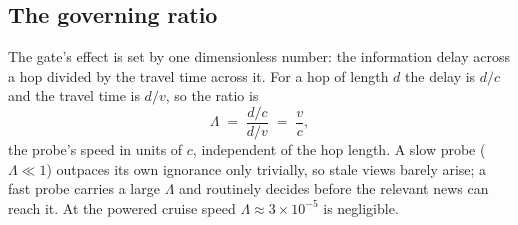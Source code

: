 \subsection{The governing ratio}
The gate's effect is set by one dimensionless number: the information delay across a hop
divided by the travel time across it. For a hop of length $d$ the delay is $d/c$ and the
travel time is $d/v$, so the ratio is
\begin{equation}
\Lambda \;=\; \frac{d/c}{d/v} \;=\; \frac{v}{c}, \label{eq:lambda}
\end{equation}
the probe's speed in units of $c$, independent of the hop length. A slow probe
($\Lambda \ll 1$) outpaces its own ignorance only trivially, so stale views barely arise; a
fast probe carries a large $\Lambda$ and routinely decides before the relevant news can reach
it. At the powered cruise speed $\Lambda \approx 3\times10^{-5}$ is negligible.

